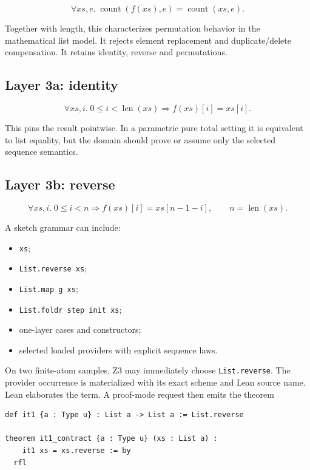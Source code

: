 \documentclass[11pt,oneside]{report}
\newcommand{\code}[1]{\texttt{#1}}
\begin{document}
\[
  \forall xs,e.\;\operatorname{count}(f(xs),e)=\operatorname{count}(xs,e).
\]

Together with length, this characterizes permutation behavior in the mathematical list model. It rejects element replacement and duplicate/delete compensation. It retains identity, reverse and permutations.

\subsection{Layer 3a: identity}

\[
  \forall xs,i.\;0\le i<\operatorname{len}(xs)
  \Longrightarrow f(xs)[i]=xs[i].
\]

This pins the result pointwise. In a parametric pure total setting it is equivalent to list equality, but the domain should prove or assume only the selected sequence semantics.

\subsection{Layer 3b: reverse}

\[
  \forall xs,i.\;0\le i<n
  \Longrightarrow f(xs)[i]=xs[n-1-i],\qquad n=\operatorname{len}(xs).
\]

A sketch grammar can include:

\begin{itemize}[leftmargin=2em]
\item \code{xs};
\item \code{List.reverse xs};
\item \code{List.map g xs};
\item \code{List.foldr step init xs};
\item one-layer cases and constructors;
\item selected loaded providers with explicit sequence laws.
\end{itemize}

On two finite-atom samples, Z3 may immediately choose \code{List.reverse}. The provider occurrence is materialized with its exact scheme and Lean source name. Lean elaborates the term. A proof-mode request then emits the theorem

\begin{lstlisting}[language=LeanX,caption={Desired proof artifact for a reverse candidate.}]
def it1 {a : Type u} : List a -> List a := List.reverse

theorem it1_contract {a : Type u} (xs : List a) :
    it1 xs = xs.reverse := by
  rfl
\end{lstlisting}
\end{document}
